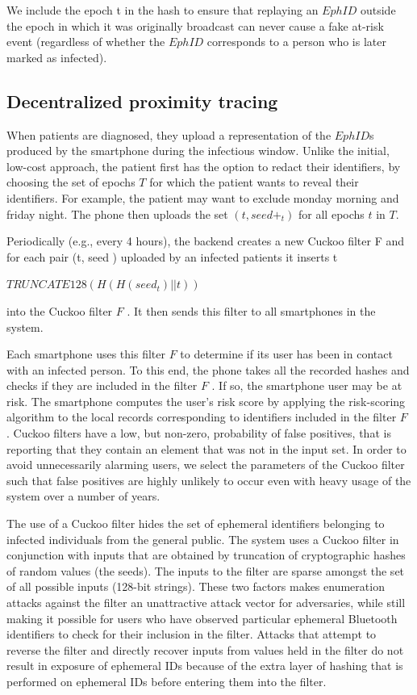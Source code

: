 \documentclass[10.8pt,a4paper]{article}
\begin{document}
We include the epoch  t in the hash to ensure that replaying an $EphID$ outside the epoch in which it was originally broadcast can never cause a fake at-risk event (regardless of whether the $EphID$ corresponds to a person who is later marked as infected).

\subsection{Decentralized proximity tracing}

When patients are diagnosed, they upload a representation of the $EphID$s produced by the smartphone during the infectious window. Unlike the initial, low-cost approach, the patient first has the option to  redact their identifiers, by choosing the set of epochs  $T$ for which the patient wants to reveal their identifiers. For example, the patient may want to exclude monday morning and friday night. The phone then uploads the set  ${(t, seed+_t)  }$ for all epochs  $t $ in  $T$.

Periodically (e.g., every 4 hours), the backend creates a new Cuckoo filter  F and for each
pair  (t, seed  )  uploaded by an infected patients it inserts t 

$TRUNCATE128(H(H(seed _t  )||t))$

into the Cuckoo filter  $F$ . It then sends this filter to all smartphones in the system.

Each smartphone uses this filter  $F$ to determine if its user has been in contact with an infected person. To this end, the phone takes all the recorded hashes and checks if they are included in the filter  $F$ . If so, the smartphone user may be at risk. The smartphone computes the user’s risk score by applying the risk-scoring algorithm to the local records corresponding to identifiers included in the filter  $F$ . Cuckoo filters have a low, but non-zero, probability of false positives, that is reporting that they contain an element that was not in the input set. In order to avoid unnecessarily alarming users, we select the parameters of the Cuckoo filter such that false positives are highly unlikely to occur even with heavy usage of the system over a number of years.

The use of a Cuckoo filter hides the set of ephemeral identifiers belonging to infected individuals from the general public. The system uses a Cuckoo filter in conjunction with inputs that are obtained by truncation of cryptographic hashes of random values (the seeds). The inputs to the filter are sparse amongst the set of all possible inputs (128-bit strings). These two factors makes enumeration attacks against the filter an unattractive attack vector for adversaries, while still making it possible for users who have observed particular ephemeral Bluetooth identifiers to check for their inclusion in the filter. Attacks that attempt to reverse the filter and directly recover inputs from values held in the filter do not result in exposure of ephemeral IDs because of the extra layer of hashing that is performed on ephemeral IDs before entering them into the filter.
\end{document}
